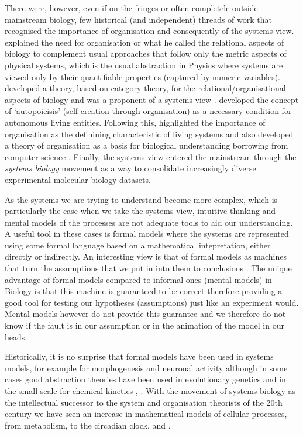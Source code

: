 \documentclass[phd]{infthesis}
\begin{document}
There were, however, even if on the fringes or often completele outside
mainstream biology, few historical (and independent) threads of work that
recognised the importance of organisation and consequently of the systems
view. \citet{rashevsky_topology_1954} explained the need for organisation or
what he called the relational aspects of biology to complement usual approaches
that follow only the metric aspects of physical systems, which is the usual
abstraction in Physics where systems are viewed only by their quantifiable
properties (captured by numeric variables). \citet{rosen_relational_1958}
developed a theory, based on category theory, for the relational/organisational
aspects of biology and was a proponent of a systems view
\citep{rosen1991life}. \citet{varela_autopoiesis:_1974} developed the concept of
`autopoieisis' (self creation through organisation) as a necessary condition for
autonomous living entities. Following this, \citet{fontana_what_1994}
highlighted the importance of organisation as the definining characteristic of
living systems and also developed a theory of organisation as a basis for
biological understanding borrowing from computer science
\citep[$\lambda$-calculus in particular;][]{fontana_barrier_1996}. Finally, the
systems view entered the mainstream through the \emph{systems biology} movement
\citep{kitano2002systems} as a way to consolidate increasingly diverse
experimental molecular biology datasets.

As the systems we are trying to understand become more complex, which is
particularly the case when we take the systems view, intuitive thinking and
mental models of the processes are not adequate tools to aid our
understanding. A useful tool in these cases is formal models where the systems
are represented using some formal language based on a mathematical
intepretation, either directly or indirectly. An interesting view is that of
formal models as machines that turn the assumptions that we put in into them to
conclusions \citep{gunawardena_models_2014}. The unique advantage of formal
models compared to informal ones (mental models) in Biology is that this machine
is guaranteed to be correct therefore providing a good tool for testing our
hypotheses (assumptions) just like an experiment would. Mental models however do
not provide this guarantee and we therefore do not know if the fault is in our
assumption or in the animation of the model in our heads.

Historically, it is no surprise that formal models have been used in systems
models, for example for morphogenesis \citep{turing_chemical_1952} and neuronal
activity \citep{hodgkin_quantitative_1952} although in some cases good
abstraction theories have been used in evolutionary genetics \citep[by
abstracting away the organism;][]{fisher} and in the small scale for chemical
kinetics \citep{michaelis-menten}, \citep[see
also;][]{gunawardena2013biology}. With the movement of systems biology as the
intellectual successor to the system and organisation theorists of the 20th
century we have seen an increase in mathematical models of cellular processes,
from metabolism, to the circadian clock, and .
\end{document}
